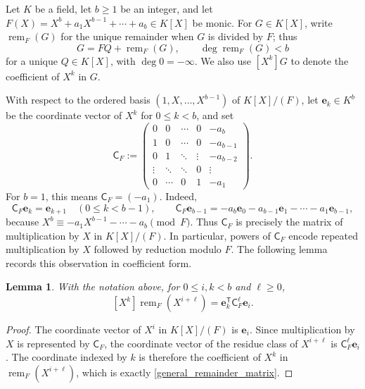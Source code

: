 \documentclass[10pt,a4paper]{amsart}
\newtheorem{lemma}{Lemma}[section]
\begin{document}
\smallskip
Let $K$ be a field, let $b\ge1$ be an integer, and let
$F(X)=X^b+a_1X^{b-1}+\cdots+a_b\in K[X]$ be monic.  For $G\in K[X]$, write $\operatorname{rem}_{F}(G)$ for the
unique remainder when $G$ is divided by $F$; thus
\[
 G=FQ+\operatorname{rem}_{F}(G),\qquad
 \deg \operatorname{rem}_{F}(G)<b
\]
for a unique $Q\in K[X]$, with $\deg 0=-\infty$.  We also use
$[X^k]G$ to denote the
coefficient of $X^k$ in $G$.

With respect to the ordered basis $(1,X,\ldots,X^{b-1})$ of
$K[X]/(F)$, let $\mathbf e_k\in K^b$ be the coordinate vector of $X^k$
for $0\le k<b$, and set
\begin{equation*}
 \mathsf C_F:=
 \begin{pmatrix}
  0&0&\cdots&0&-a_b\\
  1&0&\cdots&0&-a_{b-1}\\
  0&1&\ddots&\vdots&-a_{b-2}\\
  \vdots&\ddots&\ddots&0&\vdots\\
  0&\cdots&0&1&-a_1
 \end{pmatrix}.
\end{equation*}
For $b=1$, this means $\mathsf C_F=(-a_1)$.  Indeed,
\[
 \mathsf C_F\mathbf e_k=\mathbf e_{k+1}\quad(0\le k<b-1),
 \qquad
 \mathsf C_F\mathbf e_{b-1}
 =-a_b\mathbf e_0-a_{b-1}\mathbf e_1-\cdots-a_1\mathbf e_{b-1},
\]
because $X^b\equiv-a_1X^{b-1}-\cdots-a_b\pmod F$.
Thus $\mathsf C_F$ is precisely the matrix of multiplication by $X$
in $K[X]/(F)$.  In particular, powers of $\mathsf C_F$ encode repeated
multiplication by $X$ followed by reduction modulo $F$.  The following
lemma records this observation in coefficient form.

\begin{lemma}\label{companionremainder}
With the notation above, for $0\le i,k<b$ and $\ell\ge0$,
\begin{equation}\label{general_remainder_matrix}
 [X^k]\operatorname{rem}_{F}(X^{i+\ell})
 =\mathbf e_k^{\mathsf T}\mathsf C_F^\ell \mathbf e_i.
\end{equation}
\end{lemma}
\begin{proof}
The coordinate vector of $X^i$ in $K[X]/(F)$ is $\mathbf e_i$.  Since
multiplication by $X$ is represented by $\mathsf C_F$, the coordinate
vector of the residue class of $X^{i+\ell}$ is
$\mathsf C_F^\ell \mathbf e_i$.  The coordinate indexed by $k$ is therefore the coefficient of $X^k$ in $\operatorname{rem}_{F}(X^{i+\ell})$, which is
exactly \eqref{general_remainder_matrix}.
\end{proof}
\end{document}
